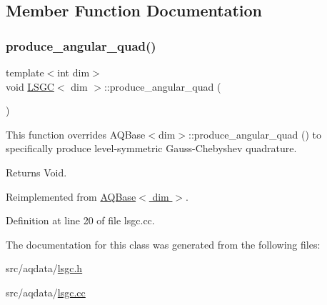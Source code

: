 \subsection{Member Function Documentation}
\mbox{\label{class_l_s_g_c_a1d135fb9ca12a9b65b8cc397479fc4d7}} 
\subsubsection{\texorpdfstring{produce\+\_\+angular\+\_\+quad()}{produce\_angular\_quad()}}
{\footnotesize\ttfamily template$<$int dim$>$ \\
void \hyperlink{class_l_s_g_c}{L\+S\+GC}$<$ dim $>$\+::produce\+\_\+angular\+\_\+quad (\begin{DoxyParamCaption}{ }\end{DoxyParamCaption})\hspace{0.3cm}{\ttfamily [virtual]}}

This function overrides A\+Q\+Base$<$dim$>$\+::produce\+\_\+angular\+\_\+quad () to specifically produce level-\/symmetric Gauss-\/\+Chebyshev quadrature.

\begin{DoxyReturn}{Returns}
Void. 
\end{DoxyReturn}


Reimplemented from \hyperlink{class_a_q_base_a16c7871be0da6c112f547f39d50258fd}{A\+Q\+Base$<$ dim $>$}.



Definition at line 20 of file lsgc.\+cc.



The documentation for this class was generated from the following files\+:\begin{DoxyCompactItemize}
\item 
src/aqdata/\hyperlink{lsgc_8h}{lsgc.\+h}\item 
src/aqdata/\hyperlink{lsgc_8cc}{lsgc.\+cc}\end{DoxyCompactItemize}
